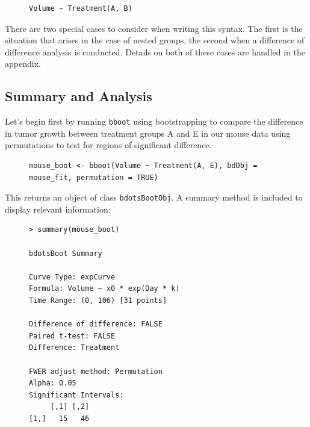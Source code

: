 \documentclass{article}
\newcommand{\xt}{\texttt}%
\begin{document}
\begin{singlespace}
\begin{figure}[H]
\centering
\begin{BVerbatim}
Volume ~ Treatment(A, B)
\end{BVerbatim}
\end{figure}
\end{singlespace}

There are two special cases to consider when writing this syntax. The first is the situation that arises in the case of nested groups, the second when a difference of difference analysis is conducted. Details on both of these cases are handled in the appendix. 

\subsection{Summary and Analysis}

Let's begin first by running \xt{bboot} using bootstrapping to compare the difference in tumor growth between treatment groups A and E in our mouse data using permutations to test for regions of significant difference. 

\begin{singlespace}
\begin{figure}[H]
\centering
\begin{BVerbatim}
mouse_boot <- bboot(Volume ~ Treatment(A, E), bdObj = mouse_fit, permutation = TRUE)
\end{BVerbatim}
\end{figure}
\end{singlespace}


This returns an object of class \xt{bdotsBootObj}. A summary method is included to display relevant information:

\begin{singlespace}
\begin{figure}[H]
\centering
\begin{BVerbatim}
> summary(mouse_boot)

bdotsBoot Summary

Curve Type: expCurve 
Formula: Volume ~ x0 * exp(Day * k) 
Time Range: (0, 106) [31 points]

Difference of difference: FALSE 
Paired t-test: FALSE 
Difference: Treatment 

FWER adjust method: Permutation 
Alpha: 0.05 
Significant Intervals:
     [,1] [,2]
[1,]   15   46
\end{BVerbatim}
\end{figure}
\end{singlespace}
\end{document}
